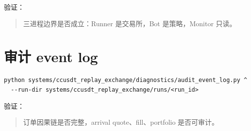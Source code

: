 验证：

\begin{quote}
三进程边界是否成立：Runner 是交易所，Bot 是策略，Monitor 只读。
\end{quote}

\section{审计 event log}

\begin{lstlisting}
python systems/ccusdt_replay_exchange/diagnostics/audit_event_log.py ^
  --run-dir systems/ccusdt_replay_exchange/runs/<run_id>
\end{lstlisting}

验证：

\begin{quote}
订单因果链是否完整，arrival quote、fill、portfolio 是否可审计。
\end{quote}

